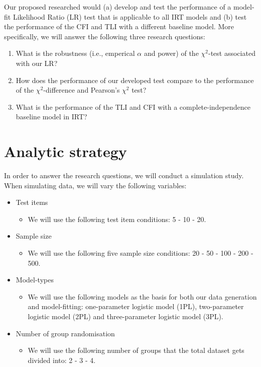 \documentclass{article}
\begin{document}
\indent Our proposed researched would (a) develop and test the performance of a model-fit Likelihood Ratio (LR) test that is applicable to all IRT models and (b) test the performance of the CFI and TLI with a different baseline model. More specifically, we will answer the following three research questions:
\begin{enumerate}
\item What is the robustness (i.e., emperical $\alpha$ and power) of the $\chi^2$-test associated with our LR?
\item How does the performance of our developed test compare to the performance of the $\chi^2$-difference and Pearson's $\chi^2$ test?
\item What is the performance of the TLI and CFI with a complete-independence baseline model in IRT?
\end{enumerate}

\part{Analytic strategy}
In order to answer the research questions, we will conduct a simulation study. When simulating data, we will vary the following variables:

\begin{itemize}
\item Test items
	\begin{itemize}
	\item We will use the following test item conditions: 5 - 10 - 20.
	\end{itemize}
\item Sample size
	\begin{itemize}
	\item We will use the following five sample size conditions: 20 - 50 - 100 - 200 - 500.
	\end{itemize}
\item Model-types
	\begin{itemize}
	\item We will use the following models as the basis for both our data generation and model-fitting: one-parameter logistic model (1PL), two-parameter logistic model (2PL) and three-parameter logistic model (3PL).
	\end{itemize}
\item Number of group randomisation
	\begin{itemize}
	\item We will use the following number of groups that the total dataset gets divided into: 2 - 3 - 4.
	\end{itemize}
\end{itemize}
\end{document}
